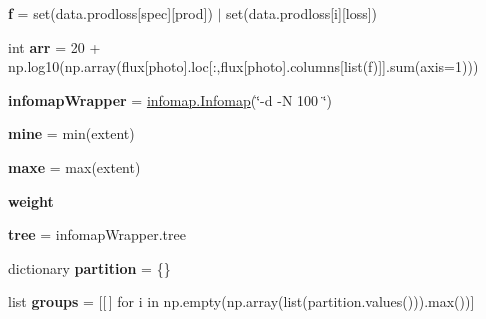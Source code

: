 \begin{DoxyCompactItemize}
{\bfseries f} = set(data.\+prodloss\mbox{[}spec\mbox{]}\mbox{[}\textquotesingle{}prod\textquotesingle{}\mbox{]}) $\vert$ set(data.\+prodloss\mbox{[}i\mbox{]}\mbox{[}\textquotesingle{}loss\textquotesingle{}\mbox{]})
\item 
\mbox{\label{namespacez__multilayer__infomap_a599444fa23ffef58f01c88dda18f620d}} 
int {\bfseries arr} = 20 + np.\+log10(np.\+array(flux\mbox{[}photo\mbox{]}.loc\mbox{[}\+:,flux\mbox{[}photo\mbox{]}.columns\mbox{[}list(f)\mbox{]}\mbox{]}.sum(axis=1)))
\item 
\mbox{\label{namespacez__multilayer__infomap_a8e27c6916b009e35b92320386ca05e30}} 
{\bfseries infomap\+Wrapper} = \mbox{\hyperlink{classinfomap_1_1Infomap}{infomap.\+Infomap}}(\char`\"{}-\/d -\/N 100 \char`\"{})
\item 
\mbox{\label{namespacez__multilayer__infomap_a7b1b4d44ff8e87cab57a95220e3b7d3e}} 
{\bfseries mine} = min(extent)
\item 
\mbox{\label{namespacez__multilayer__infomap_a2bfdcafb7193b0c3b93b050cd7b7996c}} 
{\bfseries maxe} = max(extent)
\item 
\mbox{\label{namespacez__multilayer__infomap_a26a79e6961b868cd186db260a13f88e2}} 
{\bfseries weight}
\item 
\mbox{\label{namespacez__multilayer__infomap_aa1afc2ff96375513b19a812b406e12c6}} 
{\bfseries tree} = infomap\+Wrapper.\+tree
\item 
\mbox{\label{namespacez__multilayer__infomap_ae2cb212d75d534baab9468e11031872f}} 
dictionary {\bfseries partition} = \{\}
\item 
\mbox{\label{namespacez__multilayer__infomap_a8d46555c5d57efa2133d1be53f78387c}} 
list {\bfseries groups} = \mbox{[}\mbox{[}$\,$\mbox{]} for i in np.\+empty(np.\+array(list(partition.\+values())).max())\mbox{]}
\item 
\mbox{\label{namespacez__multilayer__infomap_a676e4ca283728dd788cc424e9a7a809e}} 

\end{DoxyCompactItemize}
